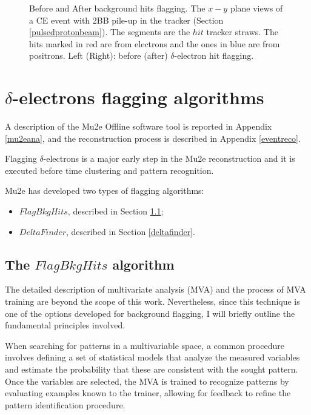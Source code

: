 \begin{figure}[!h]
\begin{subfigure}[b]{0.7\linewidth}
        \label{fig:af}
    \end{subfigure}
    \caption[Before and After background hits flagging.]{
        Before and After background hits flagging. 
        The $x-y$ plane views of a CE 
    event with 2BB pile-up in the tracker (Section \ref{pulsedprotonbeam}). 
    The segments are the $hit$ tracker straws. 
    The hits marked in
    red are from electrons and the ones in 
    blue are from positrons. Left (Right): before (after) $\delta$-electron hit flagging.}
    \label{fig:afbef} 
\end{figure}






\section{$\delta$-electrons flagging algorithms}
A description of the Mu2e Offline software 
tool is reported in 
Appendix \ref{mu2eana}, and the reconstruction 
process is described in Appendix \ref{eventreco}. 

Flagging $\delta$-electrons is a major early 
step in the Mu2e reconstruction  
and it is executed before time clustering 
and pattern recognition.

Mu2e has developed two types of flagging algorithms:
\begin{itemize}
    \item $FlagBkgHits$, described in Section \ref{flagbkghits};
    \item $DeltaFinder$, described in Section \ref{deltafinder}.
\end{itemize}

\subsection{The $FlagBkgHits$ algorithm}\label{flagbkghits}
The detailed description of multivariate 
analysis (MVA) and the 
process of MVA training are beyond the 
scope of this work. 
Nevertheless, since this technique is 
one of the options 
developed for background flagging, I 
will briefly outline 
the fundamental principles involved.

When searching for patterns in a multivariable space, 
a common procedure involves 
defining a set of statistical 
models that analyze the measured 
variables and estimate 
the probability that these are consistent with the 
sought pattern. Once the variables are selected, 
the MVA is trained to recognize patterns by 
evaluating examples known to the trainer, 
allowing for feedback to refine the 
pattern identification procedure.

